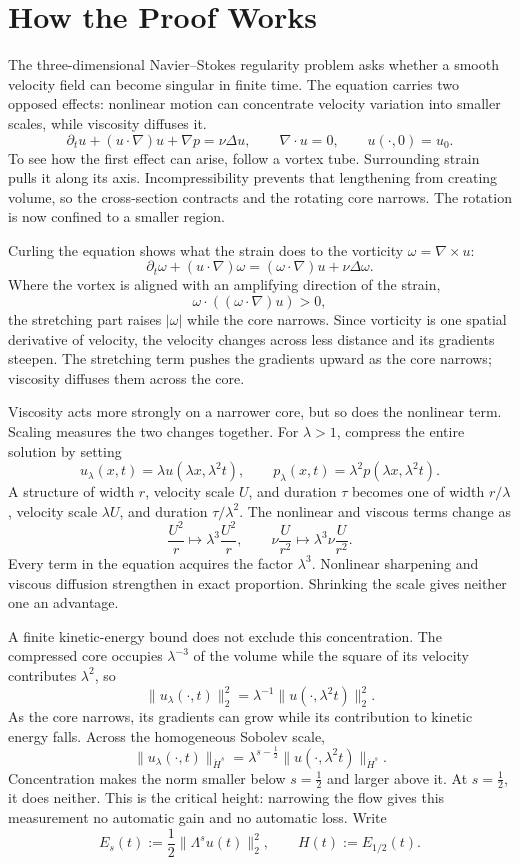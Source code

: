 \documentclass[11pt]{article}
\begin{document}
\section*{How the Proof Works}

The three-dimensional Navier--Stokes regularity problem asks whether a smooth velocity field can become singular in finite time. The equation carries two opposed effects: nonlinear motion can concentrate velocity variation into smaller scales, while viscosity diffuses it.
\[
\partial_tu+(u\cdot\nabla)u+\nabla p=\nu\Delta u,
\qquad \nabla\cdot u=0,
\qquad u(\cdot,0)=u_0.
\]
To see how the first effect can arise, follow a vortex tube. Surrounding strain pulls it along its axis. Incompressibility prevents that lengthening from creating volume, so the cross-section contracts and the rotating core narrows. The rotation is now confined to a smaller region.

Curling the equation shows what the strain does to the vorticity \(\omega=\nabla\times u\):
\[
\partial_t\omega+(u\cdot\nabla)\omega
=(\omega\cdot\nabla)u+\nu\Delta\omega.
\]
Where the vortex is aligned with an amplifying direction of the strain,
\[
\omega\cdot((\omega\cdot\nabla)u)>0,
\]
the stretching part raises \(\lvert\omega\rvert\) while the core narrows. Since vorticity is one spatial derivative of velocity, the velocity changes across less distance and its gradients steepen. The stretching term pushes the gradients upward as the core narrows; viscosity diffuses them across the core.

Viscosity acts more strongly on a narrower core, but so does the nonlinear term. Scaling measures the two changes together. For \(\lambda>1\), compress the entire solution by setting
\[
u_\lambda(x,t)=\lambda u(\lambda x,\lambda^2t),
\qquad
p_\lambda(x,t)=\lambda^2p(\lambda x,\lambda^2t).
\]
A structure of width \(r\), velocity scale \(U\), and duration \(\tau\) becomes one of width \(r/\lambda\), velocity scale \(\lambda U\), and duration \(\tau/\lambda^2\). The nonlinear and viscous terms change as
\[
\frac{U^2}{r}
\longmapsto
\lambda^3\frac{U^2}{r},
\qquad
\nu\frac{U}{r^2}
\longmapsto
\lambda^3\nu\frac{U}{r^2}.
\]
Every term in the equation acquires the factor \(\lambda^3\). Nonlinear sharpening and viscous diffusion strengthen in exact proportion. Shrinking the scale gives neither one an advantage.

A finite kinetic-energy bound does not exclude this concentration. The compressed core occupies \(\lambda^{-3}\) of the volume while the square of its velocity contributes \(\lambda^2\), so
\[
\|u_\lambda(\cdot,t)\|_2^2
=\lambda^{-1}\|u(\cdot,\lambda^2t)\|_2^2.
\]
As the core narrows, its gradients can grow while its contribution to kinetic energy falls. Across the homogeneous Sobolev scale,
\[
\|u_\lambda(\cdot,t)\|_{\dot H^s}
=\lambda^{s-\frac12}
\|u(\cdot,\lambda^2t)\|_{\dot H^s}.
\]
Concentration makes the norm smaller below \(s=\tfrac12\) and larger above it. At \(s=\tfrac12\), it does neither. This is the critical height: narrowing the flow gives this measurement no automatic gain and no automatic loss. Write
\[
E_s(t):=\frac12\|\Lambda^su(t)\|_2^2,
\qquad
H(t):=E_{1/2}(t).
\]
\end{document}
